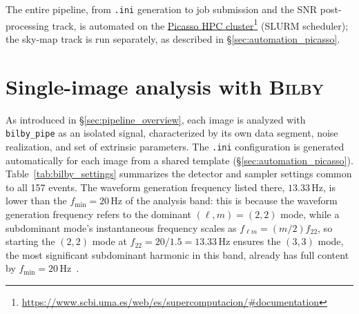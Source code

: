The entire pipeline, from \texttt{.ini} generation to job submission and the SNR post-processing track, is automated on the \href{https://www.scbi.uma.es/web/es/supercomputacion/\#documentation}{Picasso HPC cluster}\footnote{\url{https://www.scbi.uma.es/web/es/supercomputacion/\#documentation}} (SLURM scheduler); the sky-map track is run separately, as described in \S\ref{sec:automation_picasso}.


\section{Single-image analysis with \textsc{Bilby}}
\label{sec:bilby_config}

As introduced in \S\ref{sec:pipeline_overview}, each image is analyzed with \texttt{bilby\_pipe} as an isolated signal, characterized by its own data segment, noise realization, and set of extrinsic parameters. The \texttt{.ini} configuration is generated automatically for each image from a shared template (\S\ref{sec:automation_picasso}). Table~\ref{tab:bilby_settings} summarizes the detector and sampler settings common to all 157 events. The waveform generation frequency listed there, $13.33$\,Hz, is lower than the $f_{\min}=20$\,Hz of the analysis band: this is because the waveform generation frequency refers to the dominant $(\ell,m)=(2,2)$ mode, while a subdominant mode's instantaneous frequency scales as $f_{\ell m}=(m/2)f_{22}$, so starting the $(2,2)$ mode at $f_{22}=20/1.5=13.33$\,Hz ensures the $(3,3)$ mode, the most significant subdominant harmonic in this band, already has full content by $f_{\min}=20$\,Hz~\cite{higher_order_modes_waveform}.

